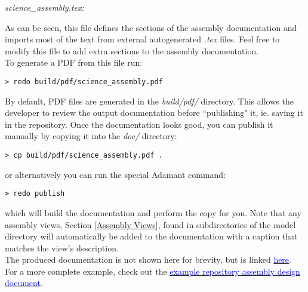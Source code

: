 \textit{science\_assembly.tex:}

As can be seen, this file defines the sections of the assembly documentation and imports most of the text from external autogenerated \textit{.tex} files. Feel free to modify this file to add extra sections to the assembly documentation. \\

To generate a PDF from this file run:

\vspace{5mm} %
\begin{verbatim}
> redo build/pdf/science_assembly.pdf
\end{verbatim}
\vspace{5mm} %

By default, PDF files are generated in the \textit{build/pdf/} directory. This allows the developer to review the output documentation before ``publishing" it, ie. saving it in the repository. Once the documentation looks good, you can publish it manually by copying it into the \textit{doc/} directory:

\vspace{5mm} %
\begin{verbatim}
> cp build/pdf/science_assembly.pdf .
\end{verbatim}
\vspace{5mm} %

or alternatively you can run the special Adamant command:

\vspace{5mm} %
\begin{verbatim}
> redo publish
\end{verbatim}
\vspace{5mm} %

which will build the documentation and perform the copy for you. Note that any assembly views, Section \ref{Assembly Views}, found in subdirectories of the model directory will automatically be added to the documentation with a caption that matches the view's description. \\

The produced documentation is not shown here for brevity, but is linked \href{https://github.com/lasp/adamant/blob/main/doc/example_architecture/doc/science_assembly.pdf}{\textcolor{blue}{here}}. For a more complete example, check out the \href{https://github.com/lasp/adamant_example/blob/main/src/assembly/linux/doc/linux_example.pdf}{\textcolor{blue}{example repository assembly design document}}.

